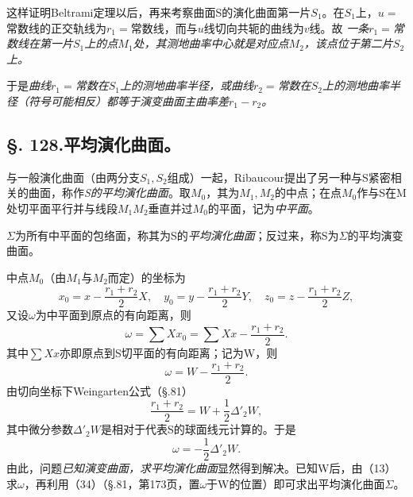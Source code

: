 这样证明Beltrami定理以后，再来考察曲面S的演化曲面第一片\(S_1\)。在\(S_1\)上，\(u=\)常数线的正交轨线为\(r_1=\)常数线，而与\(u\)线切向共轭的曲线为\(v\)线。故
\emph{一条\(r_1=\)常数线在第一片\(S_1\)上的点\(M_1\)处，其测地曲率中心就是对应点\(M_2\)，该点位于第二片\(S_2\)上。}

于是\emph{曲线\(r_1=\)常数在\(S_1\)上的测地曲率半径，或曲线\(r_2=\)常数在\(S_2\)上的测地曲率半径（符号可能相反）都等于演变曲面主曲率差\(r_1-r_2\)。}

\subsection*{\S. 128.\quad 平均演化曲面。}

与一般演化曲面（由两分支\(S_1,S_2\)组成）一起，Ribaucour提出了另一种与S紧密相关的曲面，称作\emph{S的平均演化曲面}。取\(M_0\)，其为\(M_1,M_2\)的中点；在点\(M_0\)作与S在M处切平面平行并与线段\(M_1M_2\)垂直并过\(M_0\)的平面，记为\emph{中平面}。

\(\Sigma\)为所有中平面的包络面，称其为S的\emph{平均演化曲面}；反过来，称S为\(\Sigma\)的平均演变曲面。

中点\(M_0\)（由\(M_1\)与\(M_2\)而定）的坐标为
\[
 x_0=x-\frac{r_1+r_2}{2}X,
 \quad
 y_0=y-\frac{r_1+r_2}{2}Y,
 \quad
 z_0=z-\frac{r_1+r_2}{2}Z,
\]
又设\(\omega\)为中平面到原点的有向距离，则
\[
 \omega=\sum Xx_0=\sum Xx-\frac{r_1+r_2}{2}.
\]
其中\(\sum Xx\)亦即原点到S切平面的有向距离；记为W，则
\[
 \omega=W-\frac{r_1+r_2}{2}.
\]
由切向坐标下Weingarten公式（\S.81）
\[
 \frac{r_1+r_2}{2}=W+\frac12\Delta'_2 W,
\]
其中微分参数\(\Delta'_2 W\)是相对于代表S的球面线元计算的。于是
\begin{equation}\tag{13}
 \omega=-\frac12\Delta'_2 W.
\end{equation}
由此，问题\emph{已知演变曲面，求平均演化曲面}显然得到解决。已知W后，由（13）求\(\omega\)，再利用（34）（\S.81，第173页，置\(\omega\)于W的位置）即可求出平均演化曲面\(\Sigma\)。

